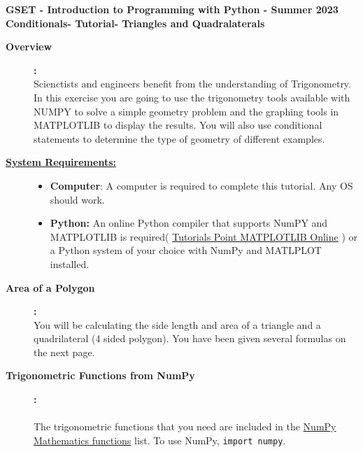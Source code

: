 \documentclass[12pt]{article}
\newcommand{\MNUM}{6} %
\newcommand{\MNAME}{Conditionals} %
\newcommand{\TNAME}{Triangles and Quadralaterals} %
\begin{document}
\thispagestyle{plain}

\begin{center}
   {\bf \large GSET - Introduction to Programming with Python - Summer 2023} \vspace{5mm}\\
   {\bf \Large \MNAME \hspc -  Tutorial\hspc\MNUM\hspc - \TNAME}\vspace{3mm}\\
   
\end{center}

	\begin{description}
		
		\item [\textbf{Overview}]\textbf{:} \\ 
        
            Scienctists and engineers benefit from the understanding of Trigonometry. In this exercise you are going to use the trigonometry tools available with NUMPY to solve a simple geometry problem and the graphing tools in MATPLOTLIB to display the results. You will also use conditional statements to determine the type of geometry of different examples.
       
        \item[\textbf{\underline{System Requirements:}}] \hfill \vspace{0mm}
            \begin{itemize}
                \item {\bf Computer}: A computer is required to complete this tutorial. Any OS should work.
                \item {\bf Python:} An online Python compiler that supports NumPY and MATPLOTLIB is required( \href{https://www.tutorialspoint.com/execute_matplotlib_online.php}{Tutorials Point MATPLOTLIB Online}  ) or a Python system of your choice with NumPy and MATLPLOT installed.
            \end{itemize}

        \item [\textbf{Area of a Polygon}]\textbf{:} \\
        
            You will be calculating the side length and area of a triangle and a quadrilateral (4 sided polygon). You have been given several formulas on the next page. \\
        
        
\item [\textbf{Trigonometric Functions from NumPy }]\textbf{:}\\\\ The trigonometric functions that you need are included in the \href{https://numpy.org/doc/stable/reference/routines.math.html}{NumPy Mathematics functions} list. To use NumPy, \lstinline{import numpy}.   


\end{description}
\end{document}
